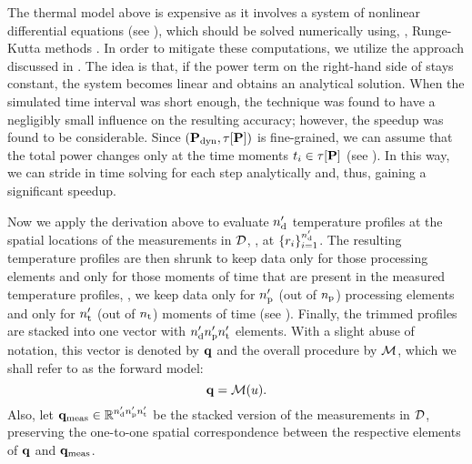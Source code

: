 



The thermal model above is expensive as it involves a system of nonlinear differential equations (see ), which should be solved numerically using, \eg, Runge-Kutta methods \cite{press2007}. In order to mitigate these computations, we utilize the approach discussed in \cite{ukhov2012}.
The idea is that, if the power term on the right-hand side of  stays constant, the system becomes linear and obtains an analytical solution. When the simulated time interval was short enough, the technique was found to have a negligibly small influence on the resulting accuracy; however, the speedup was found to be considerable.
Since $(\mathbf{P}_{\text{dyn}}, \tau[\mathbf{P}])$ is fine-grained, we can assume that the total power changes only at the time moments $t_i \in \tau[\mathbf{P}]$ (see ). In this way, we can stride in time solving  for each step analytically and, thus, gaining a significant speedup.

Now we apply the derivation above to evaluate ${n_\text{d}'}$ temperature profiles at the spatial locations of the measurements in $\mathcal{D}$, \ie, at $\{ r_i \}_{i = 1}^{n_\text{d}'}$. The resulting temperature profiles are then shrunk to keep data only for those processing elements and only for those moments of time that are present in the measured temperature profiles, \ie, we keep data only for ${n_\text{p}'}$ (out of ${n_\text{p}}$) processing elements and only for ${n_\text{t}'}$ (out of ${n_\text{t}}$) moments of time (see ). Finally, the trimmed profiles are stacked into one vector with ${n_\text{d}'} {n_\text{p}'} {n_\text{t}'}$ elements. With a slight abuse of notation, this vector is denoted by $\mathbf{q}$ and the overall procedure by $\model$, which we shall refer to as the forward model:
\begin{equation} \elabel{model}
  \mvT = \model{\u}.
\end{equation}
Also, let $\mathbf{q}_{\text{meas}} \in \mathbb{R}^{{n_\text{d}'} {n_\text{p}'} {n_\text{t}'}}$ be the stacked version of the measurements in $\mathcal{D}$, preserving the one-to-one spatial correspondence between the respective elements of $\mathbf{q}$ and $\mathbf{q}_{\text{meas}}$.
